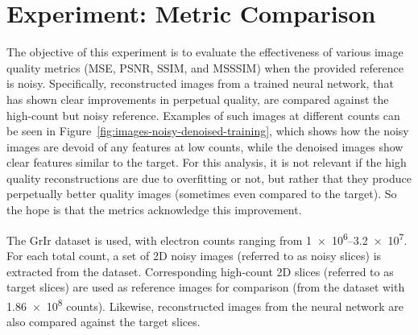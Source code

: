 \FloatBarrier
\section{Experiment: Metric Comparison}\label{sec:metric_comparison_experiment}

The objective of this experiment is to evaluate the effectiveness of various image quality metrics (\gls{MSE}, \gls{PSNR}, \gls{SSIM}, and \gls{MSSSIM}) when the provided reference is noisy. Specifically, reconstructed images from a trained neural network, that has shown clear improvements in perpetual quality, are compared against the high-count but noisy reference. Examples of such images at different counts can be seen in Figure~\ref{fig:images-noisy-denoised-training}, which shows how the noisy images are devoid of any features at low counts, while the denoised images show clear features similar to the target. For this analysis, it is not relevant if the high quality reconstructions are due to overfitting or not, but rather that they produce perpetually better quality images (sometimes even compared to the target). So the hope is that the metrics acknowledge this improvement.


The \gls{GrIr} dataset is used, with electron counts ranging from \numrange{1e6}{3.2e7}. For each total count, a set of 2D noisy images (referred to as noisy slices) is extracted from the dataset. Corresponding high-count 2D slices (referred to as target slices) are used as reference images for comparison (from the dataset with \num{1.86e8} counts). Likewise, reconstructed images from the neural network are also compared against the target slices.


